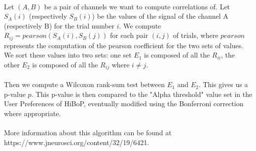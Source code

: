 \documentclass[a4paper]{article}
\begin{document}
\paragraph{} Let $(A,B)$ be a pair of channels we want to compute correlations of. Let $S_A(i)$ (respectively $S_B(i)$) be the values of the signal of the channel A (respectively B) for the trial number $i$. We compute $R_{ij} = pearson(S_A(i),S_B(j))$ for each pair $(i,j)$ of trials, where $pearson$ represents the computation of the pearson coefficient for the two sets of values. We sort these values into two sets: one set $E_1$ is composed of all the $R_{ii}$, the other $E_2$ is composed of all the $R_{ij}$ where $i \neq j$.
\paragraph{} Then we compute a Wilcoxon rank-sum test between $E_1$ and $E_2$. This gives us a p-value $p$. This p-value is then compared to the "Alpha threshold" value set in the User Preferences of HiBoP, eventually modified using the Bonferroni correction where appropriate.
\paragraph{} More information about this algorithm can be found at https://www.jneurosci.org/content/32/19/6421.
\end{document}
